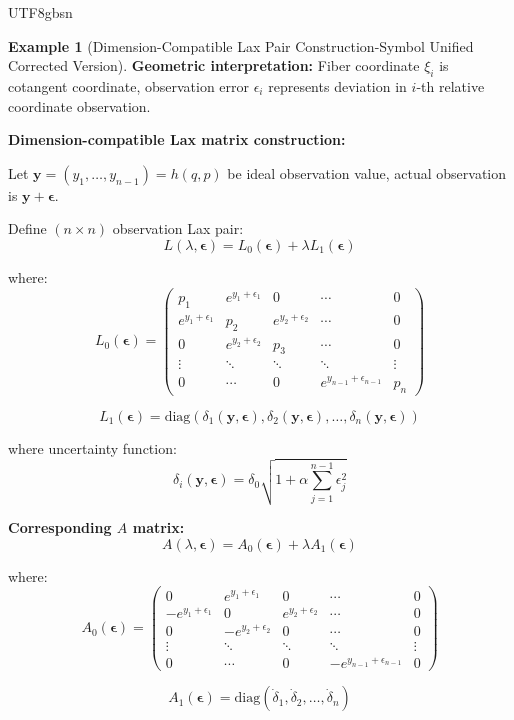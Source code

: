 \documentclass[a4paper,12pt]{extarticle}
\theoremstyle{definition}
\newtheorem{example}{Example}
\begin{document}
\begin{CJK}{UTF8}{gbsn}
\begin{example}[Dimension-Compatible Lax Pair Construction-Symbol Unified Corrected Version]
\textbf{Geometric interpretation:} Fiber coordinate $\xi_i$ is cotangent coordinate, observation error $\epsilon_i$ represents deviation in $i$-th relative coordinate observation.

\textbf{Dimension-compatible Lax matrix construction:}

Let $\boldsymbol{y} = (y_1, \ldots, y_{n-1}) = h(q,p)$ be ideal observation value, actual observation is $\boldsymbol{y} + \boldsymbol{\epsilon}$.

Define $(n \times n)$ observation Lax pair:
$$L(\lambda, \boldsymbol{\epsilon}) = L_0(\boldsymbol{\epsilon}) + \lambda L_1(\boldsymbol{\epsilon})$$

where:
$$L_0(\boldsymbol{\epsilon}) = \begin{pmatrix}
p_1 & e^{y_1 + \epsilon_1} & 0 & \cdots & 0 \\
e^{y_1 + \epsilon_1} & p_2 & e^{y_2 + \epsilon_2} & \cdots & 0 \\
0 & e^{y_2 + \epsilon_2} & p_3 & \cdots & 0 \\
\vdots & \ddots & \ddots & \ddots & \vdots \\
0 & \cdots & 0 & e^{y_{n-1} + \epsilon_{n-1}} & p_n
\end{pmatrix}$$

$$L_1(\boldsymbol{\epsilon}) = \text{diag}\left(\delta_1(\boldsymbol{y}, \boldsymbol{\epsilon}), \delta_2(\boldsymbol{y}, \boldsymbol{\epsilon}), \ldots, \delta_n(\boldsymbol{y}, \boldsymbol{\epsilon})\right)$$

where uncertainty function:
$$\delta_i(\boldsymbol{y}, \boldsymbol{\epsilon}) = \delta_0 \sqrt{1 + \alpha \sum_{j=1}^{n-1} \epsilon_j^2}$$

\textbf{Corresponding $A$ matrix:}
$$A(\lambda, \boldsymbol{\epsilon}) = A_0(\boldsymbol{\epsilon}) + \lambda A_1(\boldsymbol{\epsilon})$$

where:
$$A_0(\boldsymbol{\epsilon}) = \begin{pmatrix}
0 & e^{y_1 + \epsilon_1} & 0 & \cdots & 0 \\
-e^{y_1 + \epsilon_1} & 0 & e^{y_2 + \epsilon_2} & \cdots & 0 \\
0 & -e^{y_2 + \epsilon_2} & 0 & \cdots & 0 \\
\vdots & \ddots & \ddots & \ddots & \vdots \\
0 & \cdots & 0 & -e^{y_{n-1} + \epsilon_{n-1}} & 0
\end{pmatrix}$$

$$A_1(\boldsymbol{\epsilon}) = \text{diag}\left(\dot{\delta}_1, \dot{\delta}_2, \ldots, \dot{\delta}_n\right)$$


\end{example}
\end{CJK}
\end{document}
